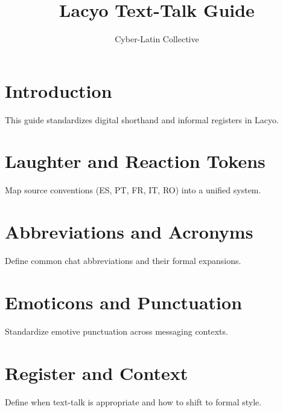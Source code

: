 \documentclass[12pt]{book}
\title{Lacyo Text-Talk Guide}
\author{Cyber-Latin Collective}
\date{}
\begin{document}
\maketitle
\tableofcontents

\chapter{Introduction}
This guide standardizes digital shorthand and informal registers in Lacyo.

\chapter{Laughter and Reaction Tokens}
Map source conventions (ES, PT, FR, IT, RO) into a unified system.

\chapter{Abbreviations and Acronyms}
Define common chat abbreviations and their formal expansions.

\chapter{Emoticons and Punctuation}
Standardize emotive punctuation across messaging contexts.

\chapter{Register and Context}
Define when text-talk is appropriate and how to shift to formal style.
\end{document}
